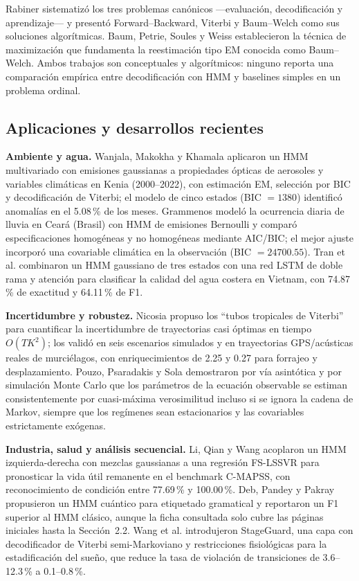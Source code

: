 \documentclass[11pt,letterpaper]{article}
\begin{document}
Rabiner \cite{rabiner1989} sistematizó los tres problemas canónicos ---evaluación, decodificación y aprendizaje--- y presentó Forward--Backward, Viterbi y Baum--Welch como sus soluciones algorítmicas. Baum, Petrie, Soules y Weiss \cite{baum1970} establecieron la técnica de maximización que fundamenta la reestimación tipo EM conocida como Baum--Welch. Ambos trabajos son conceptuales y algorítmicos: ninguno reporta una comparación empírica entre decodificación con HMM y baselines simples en un problema ordinal.

\subsection{Aplicaciones y desarrollos recientes}

\textbf{Ambiente y agua.} Wanjala, Makokha y Khamala \cite{wanjala2025} aplicaron un HMM multivariado con emisiones gaussianas a propiedades ópticas de aerosoles y variables climáticas en Kenia (2000--2022), con estimación EM, selección por BIC y decodificación de Viterbi; el modelo de cinco estados (BIC \(=1380\)) identificó anomalías en el 5.08\,\% de los meses. Grammenos \cite{grammenos2025} modeló la ocurrencia diaria de lluvia en Ceará (Brasil) con HMM de emisiones Bernoulli y comparó especificaciones homogéneas y no homogéneas mediante AIC/BIC; el mejor ajuste incorporó una covariable climática en la observación (BIC \(=24700.55\)). Tran et al. \cite{tran2026} combinaron un HMM gaussiano de tres estados con una red LSTM de doble rama y atención para clasificar la calidad del agua costera en Vietnam, con 74.87\,\% de exactitud y 64.11\,\% de F1.

\textbf{Incertidumbre y robustez.} Nicosia \cite{nicosia2026} propuso los ``tubos tropicales de Viterbi'' para cuantificar la incertidumbre de trayectorias casi óptimas en tiempo \(O(TK^2)\); los validó en seis escenarios simulados y en trayectorias GPS/acústicas reales de murciélagos, con enriquecimientos de 2.25 y 0.27 para forrajeo y desplazamiento. Pouzo, Psaradakis y Sola \cite{pouzo2025} demostraron por vía asintótica y por simulación Monte Carlo que los parámetros de la ecuación observable se estiman consistentemente por cuasi-máxima verosimilitud incluso si se ignora la cadena de Markov, siempre que los regímenes sean estacionarios y las covariables estrictamente exógenas.

\textbf{Industria, salud y análisis secuencial.} Li, Qian y Wang \cite{li2013} acoplaron un HMM izquierda-derecha con mezclas gaussianas a una regresión FS-LSSVR para pronosticar la vida útil remanente en el benchmark C-MAPSS, con reconocimiento de condición entre 77.69\,\% y 100.00\,\%. Deb, Pandey y Pakray \cite{deb2026} propusieron un HMM cuántico para etiquetado gramatical y reportaron un F1 superior al HMM clásico, aunque la ficha consultada solo cubre las páginas iniciales hasta la Sección~2.2. Wang et al. \cite{wang2026} introdujeron StageGuard, una capa con decodificador de Viterbi semi-Markoviano y restricciones fisiológicas para la estadificación del sueño, que reduce la tasa de violación de transiciones de 3.6--12.3\,\% a 0.1--0.8\,\%.
\end{document}
